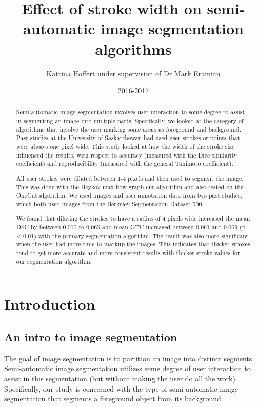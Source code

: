 \documentclass[12pt,a4paper,notitlepage]{article}
\title{Effect of stroke width on semi-automatic image segmentation algorithms}
\author{Katrina Hoffert under supervision of Dr Mark Eramian}
\date{2016-2017}
\begin{document}
\maketitle
\thispagestyle{empty}

\begin{abstract}
Semi-automatic image segmentation involves user interaction to some degree to assist in segmenting an image into multiple parts. Specifically, we looked at the category of algorithms that involve the user marking some areas as foreground and background. Past studies at the University of Saskatchewan had used user strokes or points that were always one pixel wide. This study looked at how the width of the stroke size influenced the results, with respect to accuracy (measured with the Dice similarity coefficient) and reproducibility (measured with the general Tanimoto coefficient).

All user strokes were dilated between 1-4 pixels and then used to segment the image. This was done with the Boykov max flow graph cut algorithm and also tested on the OneCut algorithm. We used images and user annotation data from two past studies, which both used images from the Berkeley Segmentation Dataset 500.

We found that dilating the strokes to have a radius of 4 pixels wide increased the mean DSC by between 0.010 to 0.065 and mean GTC increased between 0.061 and 0.069 (p < 0.01) with the primary segmentation algorithm. The result was also more significant when the user had more time to markup the images. This indicates that thicker strokes tend to get more accurate and more consistent results with thicker stroke values for our segmentation algorithm.

\end{abstract}

\section{Introduction}

\subsection{An intro to image segmentation}
The goal of image segmentation is to partition an image into distinct segments. Semi-automatic image segmentation utilizes some degree of user interaction to assist in this segmentation (but without making the user do all the work). Specifically, our study is concerned with the type of semi-automatic image segmentation that segments a foreground object from its background.
\end{document}
